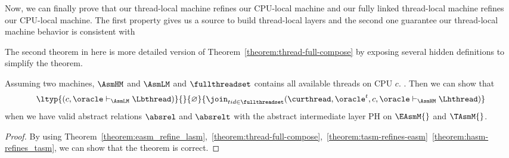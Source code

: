 Now, we can finally prove that our thread-local machine refines our CPU-local machine and our fully linked thread-local machine refines our 
CPU-local machine. 
The first property gives us a source to build thread-local layers and the second one guarantee our thread-local machine behavior is consistent with 

The second theorem in here is more detailed version of Theorem~\ref{theorem:thread-full-compose} by exposing several hidden definitions to simplify the theorem. 

\begin{theorem}
\begin{small}
Assuming two machines, $\AsmHM$ and $\AsmLM$ and $\fullthreadset$ contains all available threads on CPU $c$.
. Then we can show that
$$\ltyp{(c, \oracle \vdash_{\AsmLM} \Lbthread)}
{}
{\varnothing}{\join_{tid \in \fullthreadset} (\curthread, \oracle^{t}, c, \oracle \vdash_{\AsmHM} \Lhthread)}$$
when we have valid abstract relations $\absrel$ and $\absrelt$ with the abstract intermediate 
layer $\mathrm{PH}$ on $\EAsmM{}$ and $\TAsmM{}$.
\end{small}
\label{theorem:tasm_refines_lasm}
\end{theorem}%

\begin{proof} By using Theorem~\ref{theorem:easm_refine_lasm},~\ref{theorem:thread-full-compose},~\ref{theorem:tasm-refines-easm}~\ref{theorem:hasm-refines_tasm}, we can show that the theorem is correct.
\end{proof}




